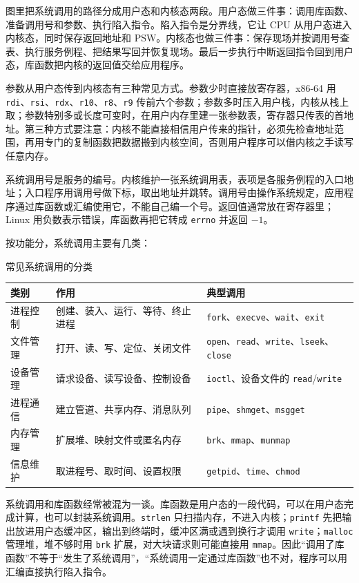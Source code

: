 图里把系统调用的路径分成用户态和内核态两段。用户态做三件事：调用库函数、准备调用号和参数、执行陷入指令。陷入指令是分界线，它让 CPU 从用户态进入内核态，同时保存返回地址和 PSW。内核态也做三件事：保存现场并按调用号查表、执行服务例程、把结果写回并恢复现场。最后一步执行中断返回指令回到用户态，库函数把内核的返回值交给应用程序。

参数从用户态传到内核态有三种常见方式。参数少时直接放寄存器，x86-64 用 \texttt{rdi}、\texttt{rsi}、\texttt{rdx}、\texttt{r10}、\texttt{r8}、\texttt{r9} 传前六个参数；参数多时压入用户栈，内核从栈上取；参数特别多或长度可变时，在用户内存里建一张参数表，寄存器只传表的首地址。第三种方式要注意：内核不能直接相信用户传来的指针，必须先检查地址范围，再用专门的复制函数把数据搬到内核空间，否则用户程序可以借内核之手读写任意内存。

系统调用号是服务的编号。内核维护一张系统调用表，表项是各服务例程的入口地址；入口程序用调用号做下标，取出地址并跳转。调用号由操作系统规定，应用程序通过库函数或汇编使用它，不能自己编一个号。返回值通常放在寄存器里；Linux 用负数表示错误，库函数再把它转成 \texttt{errno} 并返回 $-1$。

按功能分，系统调用主要有几类：

\begin{tablebox}{常见系统调用的分类}
\centering
\small
\begin{tabularx}{\linewidth}{|p{2.2cm}|X|p{4.6cm}|}
\hline
类别 & 作用 & 典型调用 \\
\hline
进程控制 & 创建、装入、运行、等待、终止进程 & \texttt{fork}、\texttt{execve}、\texttt{wait}、\texttt{exit} \\
\hline
文件管理 & 打开、读、写、定位、关闭文件 & \texttt{open}、\texttt{read}、\texttt{write}、\texttt{lseek}、\texttt{close} \\
\hline
设备管理 & 请求设备、读写设备、控制设备 & \texttt{ioctl}、设备文件的 \texttt{read}/\texttt{write} \\
\hline
进程通信 & 建立管道、共享内存、消息队列 & \texttt{pipe}、\texttt{shmget}、\texttt{msgget} \\
\hline
内存管理 & 扩展堆、映射文件或匿名内存 & \texttt{brk}、\texttt{mmap}、\texttt{munmap} \\
\hline
信息维护 & 取进程号、取时间、设置权限 & \texttt{getpid}、\texttt{time}、\texttt{chmod} \\
\hline
\end{tabularx}
\end{tablebox}

系统调用和库函数经常被混为一谈。库函数是用户态的一段代码，可以在用户态完成计算，也可以封装系统调用。\texttt{strlen} 只扫描内存，不进入内核；\texttt{printf} 先把输出放进用户态缓冲区，输出到终端时，缓冲区满或遇到换行才调用 \texttt{write}；\texttt{malloc} 管理堆，堆不够时用 \texttt{brk} 扩展，对大块请求则可能直接用 \texttt{mmap}。因此“调用了库函数”不等于“发生了系统调用”，“系统调用一定通过库函数”也不对，程序可以用汇编直接执行陷入指令。

